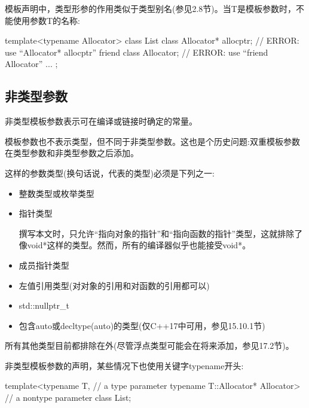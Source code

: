 模板声明中，类型形参的作用类似于类型别名(参见2.8节)。当T是模板参数时，不能使用参数T的名称:

\begin{cpp}
template<typename Allocator>
class List {
	class Allocator* allocptr; // ERROR: use “Allocator* allocptr”
	friend class Allocator; // ERROR: use “friend Allocator”
	...
};
\end{cpp}

\subsection{非类型参数}

非类型模板参数表示可在编译或链接时确定的常量。

\begin{notice}
模板参数也不表示类型，但不同于非类型参数。这也是个历史问题:双重模板参数在类型参数和非类型参数之后添加。
\end{notice}

这样的参数类型(换句话说，代表的类型)必须是下列之一:

\begin{itemize}
\item 
整数类型或枚举类型

\item 
指针类型

\begin{notice}
撰写本文时，只允许“指向对象的指针”和“指向函数的指针”类型，这就排除了像void*这样的类型。然而，所有的编译器似乎也能接受void*。
\end{notice}

\item 
成员指针类型

\item
左值引用类型(对对象的引用和对函数的引用都可以)

\item 
std::nullptr\_t

\item 
包含auto或decltype(auto)的类型(仅C++17中可用，参见15.10.1节)
\end{itemize}

所有其他类型目前都排除在外(尽管浮点类型可能会在将来添加，参见17.2节)。

非类型模板参数的声明，某些情况下也使用关键字typename开头:

\begin{cpp}
template<typename T, // a type parameter
		typename T::Allocator* Allocator> // a nontype parameter
class List;
\end{cpp}

